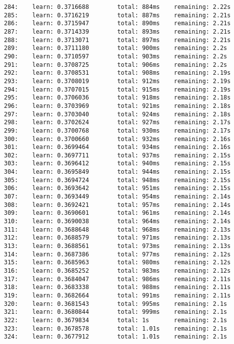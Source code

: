 \documentclass[11pt]{article}
\begin{document}
\begin{Verbatim}[commandchars=\\\{\}]
284:    learn: 0.3716688        total: 884ms    remaining: 2.22s
285:    learn: 0.3716219        total: 887ms    remaining: 2.21s
286:    learn: 0.3715947        total: 890ms    remaining: 2.21s
287:    learn: 0.3714339        total: 893ms    remaining: 2.21s
288:    learn: 0.3713071        total: 897ms    remaining: 2.21s
289:    learn: 0.3711180        total: 900ms    remaining: 2.2s
290:    learn: 0.3710597        total: 903ms    remaining: 2.2s
291:    learn: 0.3708725        total: 906ms    remaining: 2.2s
292:    learn: 0.3708531        total: 908ms    remaining: 2.19s
293:    learn: 0.3708019        total: 912ms    remaining: 2.19s
294:    learn: 0.3707015        total: 915ms    remaining: 2.19s
295:    learn: 0.3706036        total: 918ms    remaining: 2.18s
296:    learn: 0.3703969        total: 921ms    remaining: 2.18s
297:    learn: 0.3703040        total: 924ms    remaining: 2.18s
298:    learn: 0.3702624        total: 927ms    remaining: 2.17s
299:    learn: 0.3700768        total: 930ms    remaining: 2.17s
300:    learn: 0.3700660        total: 932ms    remaining: 2.16s
301:    learn: 0.3699464        total: 934ms    remaining: 2.16s
302:    learn: 0.3697711        total: 937ms    remaining: 2.15s
303:    learn: 0.3696412        total: 940ms    remaining: 2.15s
304:    learn: 0.3695849        total: 944ms    remaining: 2.15s
305:    learn: 0.3694724        total: 948ms    remaining: 2.15s
306:    learn: 0.3693642        total: 951ms    remaining: 2.15s
307:    learn: 0.3693449        total: 954ms    remaining: 2.14s
308:    learn: 0.3692421        total: 957ms    remaining: 2.14s
309:    learn: 0.3690601        total: 961ms    remaining: 2.14s
310:    learn: 0.3690038        total: 964ms    remaining: 2.14s
311:    learn: 0.3688648        total: 968ms    remaining: 2.13s
312:    learn: 0.3688579        total: 971ms    remaining: 2.13s
313:    learn: 0.3688561        total: 973ms    remaining: 2.13s
314:    learn: 0.3687386        total: 977ms    remaining: 2.12s
315:    learn: 0.3685963        total: 980ms    remaining: 2.12s
316:    learn: 0.3685252        total: 983ms    remaining: 2.12s
317:    learn: 0.3684047        total: 986ms    remaining: 2.11s
318:    learn: 0.3683338        total: 988ms    remaining: 2.11s
319:    learn: 0.3682664        total: 991ms    remaining: 2.11s
320:    learn: 0.3681543        total: 995ms    remaining: 2.1s
321:    learn: 0.3680844        total: 999ms    remaining: 2.1s
322:    learn: 0.3679834        total: 1s       remaining: 2.1s
323:    learn: 0.3678578        total: 1.01s    remaining: 2.1s
324:    learn: 0.3677912        total: 1.01s    remaining: 2.1s

\end{Verbatim}
\end{document}
